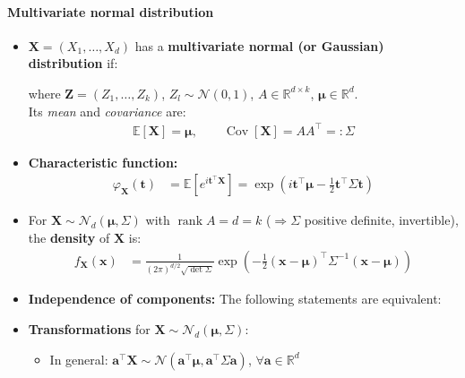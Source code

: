 \documentclass[a4paper,landscape,8pt,fleqn]{scrartcl}
\newcommand*\widefbox[1]{\fbox{\hspace{2em}#1\hspace{2em}}}		%
\renewcommand{\emph}[1]{\textbf{#1}}
\DeclareMathOperator{\Cov}{Cov}				%
\DeclareMathOperator{\rank}{rank}				%
\begin{document}
\begin{multicols*}{3}
\paragraph{Multivariate normal distribution}
\begin{itemize}
\item $\bm X = (X_1, \ldots, X_d)$ has a \emph{multivariate normal (or Gaussian) distribution} if:
where $\bm Z = (Z_1, \ldots, Z_k)$, $Z_l \sim \mathcal{N}(0,1)$, $A \in \mathbb{R}^{d \times k}$, $\bm \mu \in \mathbb{R}^d$. \\
Its \textit{mean} and \textit{covariance} are:
\begin{align*}
\mathbb{E}[\bm X] = \bm \mu, \qquad \Cov[\bm X] = A A^\top =: \Sigma
\end{align*}
\item \emph{Characteristic function:}
\begin{align*}
\varphi_{\bm X}(\bm t) &= \mathbb{E} \left[ e^{i \bm t^\top \bm X} \right] = \exp \left( i \bm t^\top \bm \mu - \frac{1}{2} \bm t^\top \Sigma \bm t \right)
\end{align*}
\item For $\bm X \sim \mathcal{N}_d(\bm \mu, \Sigma)$ with $\rank A = d = k$ ($\Rightarrow \Sigma$ positive definite, invertible), the \emph{density} of $\bm X$ is:
\begin{align*}
f_{\bm X}(\bm x) &= \frac{1}{(2\pi)^{d/2} \sqrt{\det \Sigma}} \exp \left( -\frac{1}{2} (\bm x - \bm \mu)^\top \Sigma^{-1} (\bm x - \bm \mu) \right)
\end{align*}
\item \emph{Independence of components:} The following statements are equivalent:
\item \emph{Transformations} for $\bm X \sim \mathcal{N}_d(\bm \mu, \Sigma)$:
\begin{itemize}
\item In general: $\bm a^\top \bm X \sim \mathcal{N}(\bm a^\top \bm \mu, \bm a^\top \Sigma \bm a)$, $\forall \bm a \in \mathbb{R}^d$

\end{itemize}
\end{itemize}
\end{multicols*}
\end{document}

